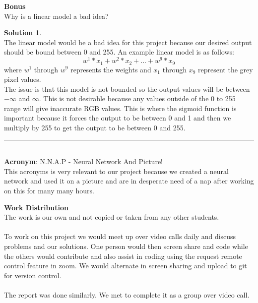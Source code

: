 \documentclass{article}
\theoremstyle{definition}
\def\fline{\rule{0.75\linewidth}{0.5pt}}
\newcommand{\finishline}{\vspace{-15pt}\begin{center}\fline\end{center}}
\newtheorem*{solution*}{Solution}
\newenvironment{solution}{\begin{solution*}}{{\finishline} \end{solution*}}
\begin{document}
\textbf{\Large Bonus} \\
    Why is a linear model a bad idea? 
    \begin{solution} \hfill \\
    The linear model would be a bad idea for this project because our desired output should be bound between 0 and 255. An example linear model is as follows:
    \[w^1*x_1 + w^2*x_2 + ... + w^9*x_9\]
    where $w^1$ through $w^9$ represents the weights and $x_1$ through $x_9$ represent the grey pixel values.\\
    The issue is that this model is not bounded so the output values will be between $-\infty$ and $\infty$. This is not desirable because any values outside of the 0 to 255 range will give inaccurate RGB values. This is where the sigmoid function is important because it forces the output to be between 0 and 1 and then we multiply by 255 to get the output to be between 0 and 255.
    \end{solution}\\
    
    \textbf{Acronym}:
    N.N.A.P - Neural Network And Picture!\\
    
    This acronyms is very relevant to our project because we created a neural network and used it on a picture and are in desperate need of a nap after working on this for many many hours.

\smallskip   

\textbf{Work Distribution}
\\
The work is our own and not copied or taken from any other students. 
\\\\
To work on this project we would meet up over video calls daily and discuss problems and our solutions. One person would then screen share and code while the others would contribute and also assist in coding using the request remote control feature in zoom. We would alternate in screen sharing and upload to git for version control. 
\\\\
The report was done similarly. We met to complete it as a group over video call.
\smallskip
\end{document}
